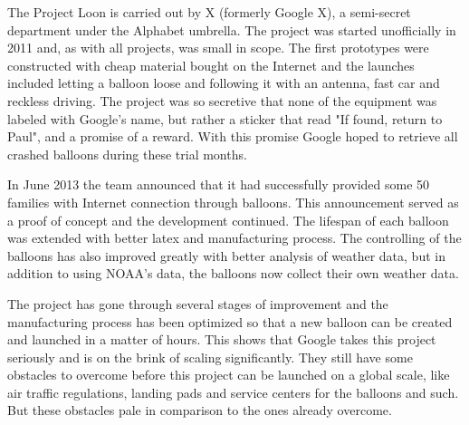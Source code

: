 The Project Loon is carried out by X (formerly Google X), a semi-secret department under the Alphabet umbrella. The project was started unofficially in 2011 and, as with all projects, was small in scope. The first prototypes were constructed with cheap material bought on the Internet and the launches included letting a balloon loose and following it with an antenna, fast car and reckless driving. The project was so secretive that none of the equipment was labeled with Google's name, but rather a sticker that read "If found, return to Paul", and a promise of a reward. With this promise Google hoped to retrieve all crashed balloons during these trial months.

In June 2013 the team announced that it had successfully provided some 50 families with Internet connection through balloons. This announcement served as a proof of concept and the development continued. The lifespan of each balloon was extended with better latex and manufacturing process. The controlling of the balloons has also improved greatly with better analysis of weather data, but in addition to using NOAA's data, the balloons now collect their own weather data.

The project has gone through several stages of improvement and the manufacturing process has been optimized so that a new balloon can be created and launched in a matter of hours. This shows that Google takes this project seriously and is on the brink of scaling significantly. They still have some obstacles to overcome before this project can be launched on a global scale, like air traffic regulations, landing pads and service centers for the balloons and such. But these obstacles pale in comparison to the ones already overcome.